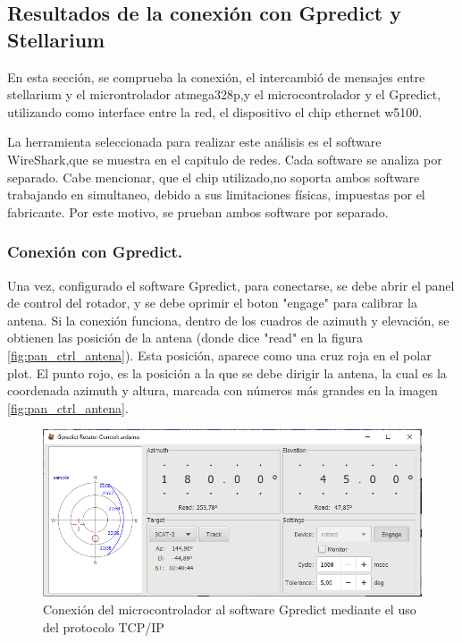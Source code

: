 \subsection{Resultados de la conexión con Gpredict y Stellarium} 

En esta sección, se comprueba la conexión, el intercambió de mensajes entre stellarium y el microntrolador atmega328p,y el microcontrolador y el Gpredict, utilizando como interface entre la red, el dispositivo el chip ethernet w5100. 

La herramienta seleccionada para realizar este análisis es el software WireShark,que se muestra en el capitulo de redes. Cada software se analiza por separado. Cabe mencionar, que el chip utilizado,no soporta ambos software trabajando en simultaneo, debido a sus limitaciones físicas, impuestas por el fabricante. Por este motivo, se prueban ambos software por separado. 

\subsubsection{Conexión con Gpredict.} 

Una vez, configurado el software Gpredict, para conectarse, se debe abrir el panel de control del rotador, y se debe oprimir el boton "engage" para calibrar la antena. Si la conexión funciona, dentro de los cuadros de azimuth y elevación, se obtienen las posición de la antena (donde dice "read" en la figura \ref{fig:pan_ctrl_antena}). Esta posición, aparece como una cruz roja en el polar plot. El punto rojo, es la posición a la que se debe dirigir la antena, la cual es la coordenada azimuth y altura, marcada con números más grandes en la imagen \ref{fig:pan_ctrl_antena}. 


\begin{figure}[ht]
	\includegraphics[scale=0.7]{gpred_rotador} 
	\caption{Conexión del microcontrolador al software Gpredict mediante el uso del protocolo TCP/IP} 
	\label{fig:prueba_gpredict_1} 
\end{figure}

